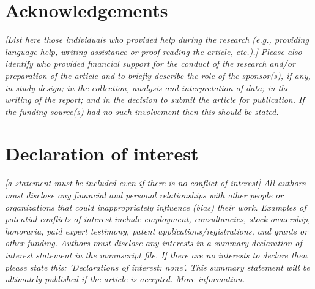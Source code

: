\documentclass[11pt, letterpaper]{article}
\begin{document}
\section{Acknowledgements}

\textit{[List here those individuals who provided help during the research (e.g., providing language help, writing assistance or proof reading the article, etc.).] Please also identify who provided financial support for the conduct of the research and/or preparation of the article and to briefly describe the role of the sponsor(s), if any, in study design; in the collection, analysis and interpretation of data; in the writing of the report; and in the decision to submit the article for publication. If the funding source(s) had no such involvement then this should be stated.}

\section{Declaration of interest}

\textit{[a statement must be included even if there is no conflict of interest] \linebreak
All authors must disclose any financial and personal relationships with other people or organizations that could inappropriately influence (bias) their work. Examples of potential conflicts of interest include employment, consultancies, stock ownership, honoraria, paid expert testimony, patent applications/registrations, and grants or other funding. Authors must disclose any interests in a summary declaration of interest statement in the manuscript file. If there are no interests to declare then please state this: 'Declarations of interest: none'. This summary statement will be ultimately published if the article is accepted. More information.}
\end{document}
